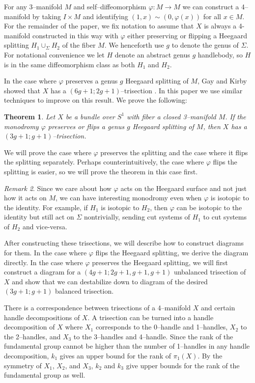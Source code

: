 \documentclass[12pt]{amsart}
\newtheorem{thm}{Theorem}
\theoremstyle{definition}
\theoremstyle{remark}
\newtheorem{rem}[thm]{Remark}
\begin{document}
For any 3--manifold $M$ and self--diffeomorphism $\varphi \colon M \to M$ we can construct a 4--manifold by taking $I \times M$ and identifying $(1,x) \sim (0,\varphi(x))$ for all $x \in M$. For the remainder of the paper, we fix notation to assume that $X$ is always a 4-manifold constructed in this way with $\varphi$ either preserving or flipping a Heegaard splitting $H_1 \cup_\Sigma H_2$ of the fiber $M$.  We henceforth use $g$ to denote the genus of $\Sigma$.  For notational convenience we let $H$ denote an abstract genus $g$ handlebody, so $H$ is in the same diffeomorphism class as both $H_1$ and $H_2$.

In the case where $\varphi$ preserves a genus $g$ Heegaard splitting of $M$, Gay and Kirby showed that $X$ has a $(6g+1;2g+1)$--trisection \cite{GayKirby1}.  In this paper we use similar techniques to improve on this result.  We prove the following:

\begin{thm}
\label{mainresult}
Let $X$ be a bundle over $S^1$ with fiber a closed 3--manifold $M$.  If the monodromy $\varphi$ preserves or flips a genus $g$ Heegaard splitting of $M$, then $X$ has a $(3g+1;g+1)$--trisection.
\end{thm}

We will prove the case where $\varphi$ preserves the splitting and the case where it flips the splitting separately.  Perhaps counterintuitively, the case where $\varphi$ flips the splitting is easier, so we will prove the theorem in this case first.

\begin{rem}
Since we care about how $\varphi$ acts on the Heegaard surface and not just how it acts on $M$, we can have interesting monodromy even when $\varphi$ is isotopic to the identity.  For example, if $H_1$ is isotopic to $H_2$, then $\varphi$ can be isotopic to the identity but still act on $\Sigma$ nontrivially, sending cut systems of $H_1$ to cut systems of $H_2$ and vice-versa.
\end{rem}

After constructing these trisections, we will describe how to construct diagrams for them.  In the case where $\varphi$ flips the Heegaard splitting, we derive the diagram directly.  In the case where $\varphi$ preserves the Heegaard splitting, we will first construct a diagram for a $(4g+1;2g+1,g+1,g+1)$ unbalanced trisection of $X$ and show that we can destabilize down to diagram of the desired $(3g+1;g+1)$ balanced trisection.

There is a correspondence between trisections of a 4--manifold $X$ and certain handle decompositions of $X$.  A trisection can be turned into a handle decomposition of $X$ where $X_1$ corresponds to the 0--handle and 1--handles, $X_2$ to the 2--handles, and $X_3$ to the 3--handles and 4--handle.  Since the rank of the fundamental group cannot be higher than the number of 1--handles in any handle decomposition, $k_1$ gives an upper bound for the rank of $\pi_1(X)$.  By the symmetry of $X_1$, $X_2$, and $X_3$, $k_2$ and $k_3$ give upper bounds for the rank of the fundamental group as well.  
\end{document}
